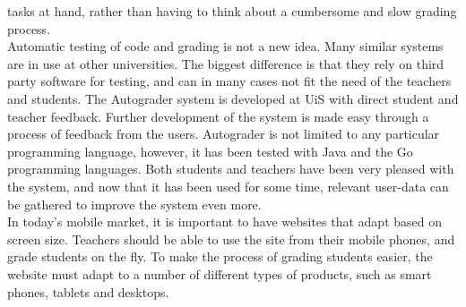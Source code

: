 tasks at hand, rather than having to think about a cumbersome and slow grading process. \\Automatic testing of code and grading is not a new idea. Many similar systems are in use at other universities. The biggest difference is that they rely on third party software for testing, and can in many cases not fit the need of the teachers and students. The Autograder system is developed at UiS with direct student and teacher feedback. Further development of the system is made easy through a process of feedback from the users. Autograder is not limited to any particular programming language, however, it has been tested with Java and the Go programming languages. Both students and teachers have been very pleased with the system, and now that it has been used for some time, relevant user-data can be gathered to improve the system even more. \\In today's mobile market, it is important to have websites that adapt based on screen size. Teachers should be able to use the site from their mobile phones, and grade students on the fly. To make the process of grading students easier, the website must adapt to a number of different types of products, such as smart phones, tablets and desktops.
